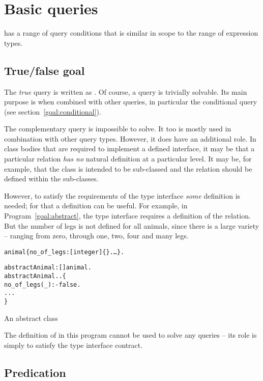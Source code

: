 \section{Basic queries}
\label{goal:basic}
\go has a range of query conditions that is similar in scope to the range of expression types. 
\subsection{True/false goal}
The \emph{true} query is written as . Of course, a  query is trivially solvable. Its main purpose is when combined with other queries, in particular the conditional query (see section~\vref{goal:conditional}).

The complementary  query is impossible to solve. It too is mostly used in combination with other query types. However, it does have an additional role. In class bodies that are required to implement a defined interface, it may be that a particular relation \emph{has no} natural definition at a particular level. It may be, for example, that the class is intended to be sub-classed and the relation should be defined within the sub-classes.

However, to satisfy the requirements of the type interface \emph{some} definition is needed; for that a  definition can be useful. For example, in Program~\vref{goal:abstract}, the type interface requires a definition of the  relation. But the number of legs is not defined for all animals, since there is a large variety -- ranging from zero, through one, two, four and many legs.
\begin{program}
\vspace{0.5ex}
\begin{alltt}
animal \impl \{ no_of_legs:[integer]\{\}. \ldots \}.

abstractAnimal:[]\conarrow{}animal.
abstractAnimal..\{
  no_of_legs(_) :- false.
  ...
\}
\end{alltt}
\vspace{-2ex}
\label{goal:abstract}\caption{An abstract  class}
\end{program}
The definition of  in this program cannot be used to solve any queries -- its role is simply to satisfy the type interface contract.

\subsection{Predication}
\label{goal:predication}

